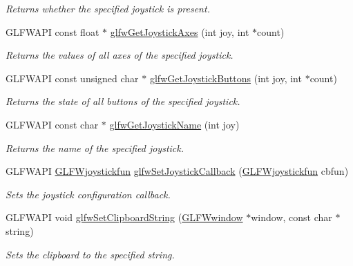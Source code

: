 \begin{DoxyCompactItemize}
\begin{DoxyCompactList}\small\item\em Returns whether the specified joystick is present. \end{DoxyCompactList}\item 
G\+L\+F\+W\+A\+PI const float $\ast$ \hyperlink{group__input_gaab9e573d808b088c5079c0f577d39448}{glfw\+Get\+Joystick\+Axes} (int joy, int $\ast$count)
\begin{DoxyCompactList}\small\item\em Returns the values of all axes of the specified joystick. \end{DoxyCompactList}\item 
G\+L\+F\+W\+A\+PI const unsigned char $\ast$ \hyperlink{group__input_ga3951bea72b5fb4870b1aa0e5c2e9c903}{glfw\+Get\+Joystick\+Buttons} (int joy, int $\ast$count)
\begin{DoxyCompactList}\small\item\em Returns the state of all buttons of the specified joystick. \end{DoxyCompactList}\item 
G\+L\+F\+W\+A\+PI const char $\ast$ \hyperlink{group__input_gac50a4fd9b01886cf9fa2c45f19191fb8}{glfw\+Get\+Joystick\+Name} (int joy)
\begin{DoxyCompactList}\small\item\em Returns the name of the specified joystick. \end{DoxyCompactList}\item 
G\+L\+F\+W\+A\+PI \hyperlink{group__input_gaa67aa597e974298c748bfe4fb17d406d}{G\+L\+F\+Wjoystickfun} \hyperlink{group__input_ga07524a1122a03642b1d28822ea931094}{glfw\+Set\+Joystick\+Callback} (\hyperlink{group__input_gaa67aa597e974298c748bfe4fb17d406d}{G\+L\+F\+Wjoystickfun} cbfun)
\begin{DoxyCompactList}\small\item\em Sets the joystick configuration callback. \end{DoxyCompactList}\item 
G\+L\+F\+W\+A\+PI void \hyperlink{group__input_ga7a580309bbc185a0459c3559021d2fd7}{glfw\+Set\+Clipboard\+String} (\hyperlink{group__window_ga3c96d80d363e67d13a41b5d1821f3242}{G\+L\+F\+Wwindow} $\ast$window, const char $\ast$string)
\begin{DoxyCompactList}\small\item\em Sets the clipboard to the specified string. \end{DoxyCompactList}\item 

\end{DoxyCompactItemize}
